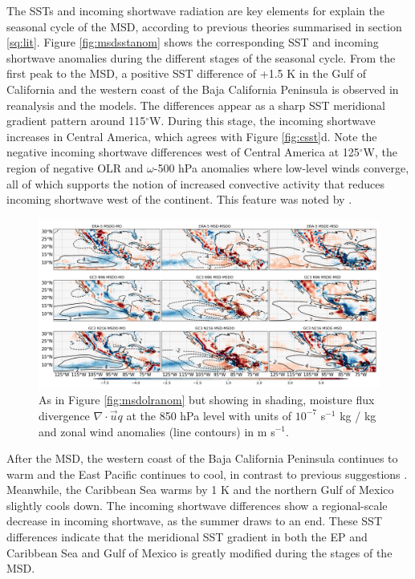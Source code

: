 The SSTs and incoming shortwave radiation are key elements for explain the seasonal cycle of the MSD, according to previous theories summarised in section \ref{sq:lit}. 
Figure \ref{fig:msdsstanom} shows the corresponding SST and incoming shortwave anomalies during the different stages of the seasonal cycle. %
From the first peak to the MSD, a positive SST difference of +1.5 K in the Gulf of California and the western coast of the Baja California Peninsula is observed in reanalysis and the models. The differences appear as a sharp SST meridional gradient pattern around 115$^\circ$W. 
During this stage, the incoming shortwave increases in Central America, which agrees with Figure \ref{fig:csst}d. 
Note the negative incoming shortwave differences west of Central America at 125$^\circ$W, the region of negative OLR and $\omega$-500 hPa anomalies where low-level winds converge, all of which supports the notion of increased convective activity that reduces incoming shortwave west of the continent. This feature was noted by \cite{herrera2015}. 

 \begin{figure}[t!]
\includegraphics[width=\linewidth]{figures/modcompar_dif2mfc3}
\caption{As in Figure \ref{fig:msdolranom} but showing in shading, moisture flux divergence $\nabla \cdot \vec{u}q$ at the 850 hPa level with units of $10^{-7}$ s$^{-1}$ kg / kg and zonal wind anomalies (line contours) in m s$^{-1}$.  }
\label{fig:msdmfcanom}
\end{figure}

After the MSD, the western coast of the Baja California Peninsula continues to warm and the East Pacific continues to cool, in contrast to previous suggestions \citep{magana1999,magana2005,herrera2015}. Meanwhile, the Caribbean Sea warms by 1 K and the northern Gulf of Mexico slightly cools down. The incoming shortwave differences show a regional-scale decrease in incoming shortwave, as the summer draws to an end. 
These SST differences indicate that the meridional SST gradient in both the EP and Caribbean Sea and Gulf of Mexico is greatly modified during the stages of the MSD. 


